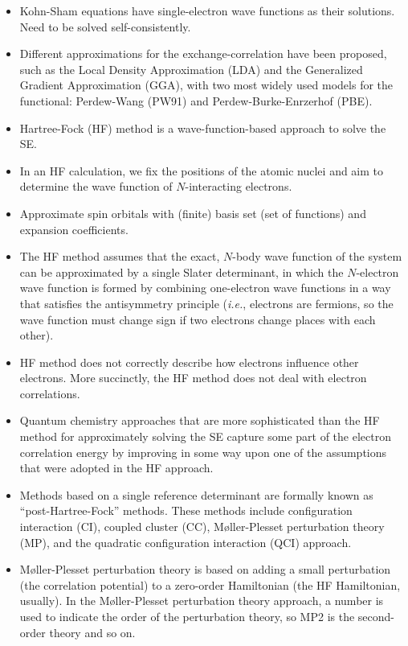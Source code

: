 \documentclass[letter, 12pt]{article}
\begin{document}
\begin{itemize}
	\item Kohn-Sham equations have single-electron wave functions as their solutions. Need to be solved self-consistently.
	
	\item Different approximations for the exchange-correlation have been proposed, such as the Local Density Approximation (LDA) and the Generalized Gradient Approximation (GGA), with two most widely used models for the functional: Perdew-Wang (PW91) and Perdew-Burke-Enrzerhof (PBE).
	
	\item Hartree-Fock (HF) method is a wave-function-based approach to solve the SE.
	
	\item In an HF calculation, we fix the positions of the atomic nuclei and aim to determine the wave function of $N$-interacting electrons.
	
	\item Approximate spin orbitals with (finite) basis set (set of functions) and expansion coefficients.
	
	\item The HF method assumes that the exact, $N$-body wave function of the system can be approximated by a single Slater determinant, in which the $N$-electron wave function is formed by combining one-electron wave functions in a way that satisfies the antisymmetry principle (\textit{i.e.}, electrons are fermions, so the wave function must change sign if two electrons change places with each other).
	
	\item HF method does not correctly describe how electrons influence other electrons. More succinctly, the HF method does not deal with electron correlations.
	
	\item Quantum chemistry approaches that are more sophisticated than the HF method for approximately solving the SE capture some part of the electron correlation energy by improving in some way upon one of the assumptions that were adopted in the HF approach.
	
	\item Methods based on a single reference determinant are formally known as ``post-Hartree-Fock'' methods. These methods include configuration interaction (CI), coupled cluster (CC), M{\o}ller-Plesset perturbation theory (MP), and the quadratic configuration interaction (QCI) approach.
	
	\item M{\o}ller-Plesset perturbation theory is based on adding a small perturbation (the correlation potential) to a zero-order Hamiltonian (the HF Hamiltonian, usually). In the M{\o}ller-Plesset perturbation theory approach, a number is used to indicate the order of the perturbation theory, so MP2 is the second-order theory and so on.
	

\end{itemize}
\end{document}
